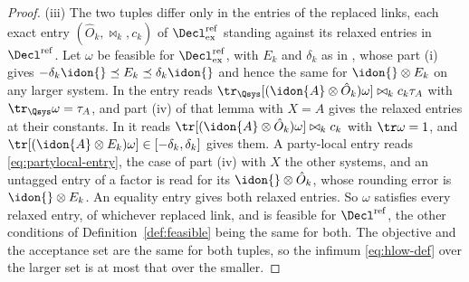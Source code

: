 \begin{proof}
(iii) The two tuples differ only in the entries of the replaced links, each
exact entry $(\hat O_k,\bowtie_k,c_k)$ of $\Decl^{\mathrm{ref}}_{\mathrm{ex}}$
standing against its relaxed entries in $\Decl^{\mathrm{ref}}$. Let
$\omega$ be feasible for $\Decl^{\mathrm{ref}}_{\mathrm{ex}}$, with $E_k$ and
$\delta_k$ as in , whose part (i) gives
$-\delta_k\idon{}\preceq E_k\preceq\delta_k\idon{}$ and hence the same for
$\idon{}\otimes E_k$ on any larger system. In
 the entry reads
$\tr_{\Qsys}[(\idon{A}\otimes\hat O_k)\omega]\bowtie_kc_k\tau_A$ with
$\tr_{\Qsys}\omega=\tau_A$, and part (iv) of that lemma with $X=A$ gives
the relaxed entries at their constants. In  it
reads $\tr[(\idon{A}\otimes\hat O_k)\omega]\bowtie_kc_k$ with
$\tr\omega=1$, and
$\tr[(\idon{A}\otimes E_k)\omega]\in[-\delta_k,\delta_k]$ gives them. A
party-local entry reads \eqref{eq:partylocal-entry}, the case of part (iv)
with $X$ the other systems, and an untagged entry of a factor is read for
its  $\idon{}\otimes\hat O_k$, whose rounding error is
$\idon{}\otimes E_k$. An equality entry gives both relaxed entries. So
$\omega$ satisfies every relaxed entry, of whichever replaced link, and is
feasible for $\Decl^{\mathrm{ref}}$, the other conditions of
Definition~\ref{def:feasible} being the same for both. The objective and the
acceptance set are the same for both tuples, so the infimum
\eqref{eq:hlow-def} over the larger set is at most that over the smaller.
\end{proof}
